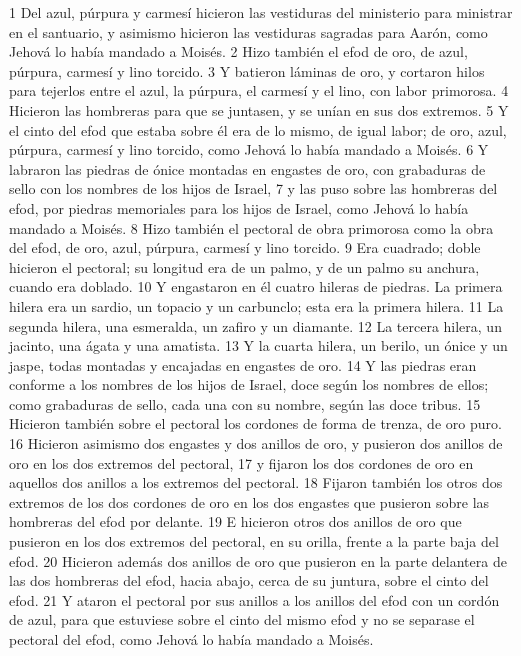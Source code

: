 1 Del azul, púrpura y carmesí hicieron las vestiduras del ministerio para ministrar en el santuario, y asimismo hicieron las vestiduras sagradas para Aarón, como Jehová lo había mandado a Moisés.
2 Hizo también el efod de oro, de azul, púrpura, carmesí y lino torcido.
3 Y batieron láminas de oro, y cortaron hilos para tejerlos entre el azul, la púrpura, el carmesí y el lino, con labor primorosa.
4 Hicieron las hombreras para que se juntasen, y se unían en sus dos extremos.
5 Y el cinto del efod que estaba sobre él era de lo mismo, de igual labor; de oro, azul, púrpura, carmesí y lino torcido, como Jehová lo había mandado a Moisés.
6 Y labraron las piedras de ónice montadas en engastes de oro, con grabaduras de sello con los nombres de los hijos de Israel,
7 y las puso sobre las hombreras del efod, por piedras memoriales para los hijos de Israel, como Jehová lo había mandado a Moisés.
8 Hizo también el pectoral de obra primorosa como la obra del efod, de oro, azul, púrpura, carmesí y lino torcido.
9 Era cuadrado; doble hicieron el pectoral; su longitud era de un palmo,  y de un palmo su anchura, cuando era doblado.
10 Y engastaron en él cuatro hileras de piedras. La primera hilera era un sardio, un topacio y un carbunclo; esta era la primera hilera.
11 La segunda hilera, una esmeralda, un zafiro y un diamante.
12 La tercera hilera, un jacinto, una ágata y una amatista.
13 Y la cuarta hilera, un berilo, un ónice y un jaspe, todas montadas y encajadas en engastes de oro.
14 Y las piedras eran conforme a los nombres de los hijos de Israel, doce según los nombres de ellos; como grabaduras de sello, cada una con su nombre, según las doce tribus.
15 Hicieron también sobre el pectoral los cordones de forma de trenza, de oro puro.
16 Hicieron asimismo dos engastes y dos anillos de oro, y pusieron dos anillos de oro en los dos extremos del pectoral,
17 y fijaron los dos cordones de oro en aquellos dos anillos a los extremos del pectoral.
18 Fijaron también los otros dos extremos de los dos cordones de oro en los dos engastes que pusieron sobre las hombreras del efod por delante.
19 E hicieron otros dos anillos de oro que pusieron en los dos extremos del pectoral, en su orilla, frente a la parte baja del efod.
20 Hicieron además dos anillos de oro que pusieron en la parte delantera de las dos hombreras del efod, hacia abajo, cerca de su juntura, sobre el cinto del efod.
21 Y ataron el pectoral por sus anillos a los anillos del efod con un cordón de azul, para que estuviese sobre el cinto del mismo efod y no se separase el pectoral del efod, como Jehová lo había mandado a Moisés.

